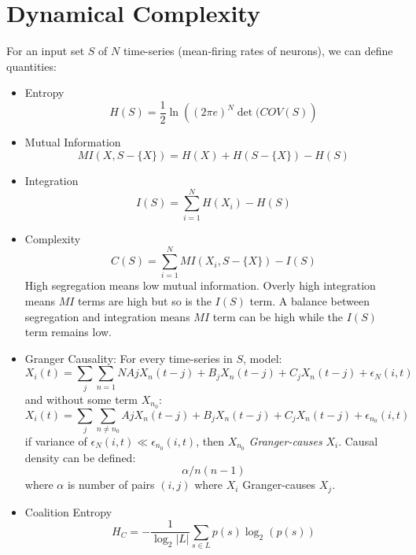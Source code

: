 \documentclass[a4paper,10pt]{article}
\begin{document}
\section{Dynamical Complexity}
For an input set $S$ of $N$ time-series (mean-firing rates of neurons), we can define quantities:
\begin{itemize}
  \item Entropy
  $$
  H(S) = \frac{1}{2}\ln\left((2\pi e)^N \det(COV(S)\right)
  $$
  \item Mutual Information
  $$
  MI(X, S-\{X\}) = H(X) + H(S-\{X\}) - H(S)
  $$
  \item Integration
  $$
  I(S) = \sum_{i = 1}^N H(X_i) - H(S)
  $$
  \item Complexity
  $$
  C(S) = \sum_{i=1}^N MI(X_i, S-\{X\}) - I(S)
  $$
  High segregation means low mutual information.  Overly high integration means $MI$ terms are high but so is the $I(S)$ term.  A balance between segregation and integration means $MI$ term can be high while the $I(S)$ term remains low.
  \item Granger Causality: For every time-series in $S$, model:
  $$
  X_i(t) =\sum_j\sum_{n = 1}{N} Aj X_n(t-j) + B_j X_n(t-j) + C_jX_n(t-j) + \epsilon_N(i, t)
  $$
  and without some term $X_{n_0}$:
  $$
  X_i(t) =\sum_j\sum_{n \neq n_0} Aj X_n(t-j) + B_j X_n(t-j) + C_jX_n(t-j) + \epsilon_{n_0}(i, t)
  $$
  if variance of $\epsilon_N(i, t) \ll \epsilon_{n_0}(i,t)$, then $X_{n_0}$ \emph{Granger-causes} $X_i$.  Causal density can be defined:
  $$
  \alpha / n(n-1)
  $$
  where $\alpha$ is number of pairs $(i,j)$ where $X_i$ Granger-causes $X_j$.
  \item Coalition Entropy
  $$
  H_C = -\frac{1}{\log_2|L|}\sum_{s\in L} p(s)\log_2(p(s))
  $$
\end{itemize}
\end{document}
